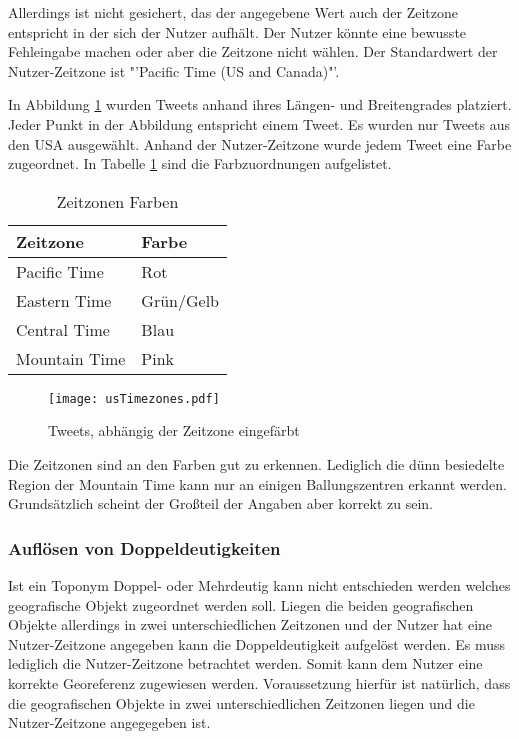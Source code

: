 				Allerdings ist nicht gesichert, das der angegebene Wert auch der Zeitzone entspricht in der sich der Nutzer aufhält.
				Der Nutzer könnte eine bewusste Fehleingabe machen oder aber die Zeitzone nicht wählen.
				Der Standardwert der Nutzer-Zeitzone ist "'Pacific Time (US and Canada)"'.

				In Abbildung \ref{img:usTimezones} wurden Tweets anhand ihres Längen- und Breitengrades platziert.
				Jeder Punkt in der Abbildung entspricht einem Tweet.
				Es wurden nur Tweets aus den USA ausgewählt.
				Anhand der Nutzer-Zeitzone wurde jedem Tweet eine Farbe zugeordnet.
				In Tabelle \ref{tab:timezoneColors} sind die Farbzuordnungen aufgelistet. 

				\begin{table}[h]
				\centering
				\caption{Zeitzonen Farben}
				\label{tab:timezoneColors}
					\begin{tabular}{|l|l|}
						\hline
						Zeitzone      & Farbe     \\ \hline \hline
						Pacific Time  & Rot       \\ \hline
						Eastern Time  & Grün/Gelb \\ \hline
						Central Time  & Blau      \\ \hline
						Mountain Time & Pink      \\ \hline
					\end{tabular}
				\end{table}

				 \begin{figure}[!ht]
					\begin{center}
						\texttt{[image: usTimezones.pdf]}
						\caption{Tweets, abhängig der Zeitzone eingefärbt}
						\label{img:usTimezones}
					\end{center}
				\end{figure}	

				 Die Zeitzonen sind an den Farben gut zu erkennen. 
				 Lediglich die dünn besiedelte Region der Mountain Time kann nur an einigen Ballungszentren erkannt werden. 
				 Grundsätzlich scheint der Großteil der Angaben aber korrekt zu sein.

			\subsubsection{Auflösen von Doppeldeutigkeiten}

				Ist ein Toponym Doppel- oder Mehrdeutig kann nicht entschieden werden welches geografische Objekt zugeordnet werden soll.
				Liegen die beiden geografischen Objekte allerdings in zwei unterschiedlichen Zeitzonen und der Nutzer hat eine Nutzer-Zeitzone angegeben kann die Doppeldeutigkeit aufgelöst werden.
				Es muss lediglich die Nutzer-Zeitzone betrachtet werden.
				Somit kann dem Nutzer eine korrekte Georeferenz zugewiesen werden.
				Voraussetzung hierfür ist natürlich, dass die geografischen Objekte in zwei unterschiedlichen Zeitzonen liegen und die Nutzer-Zeitzone angegegeben ist.

